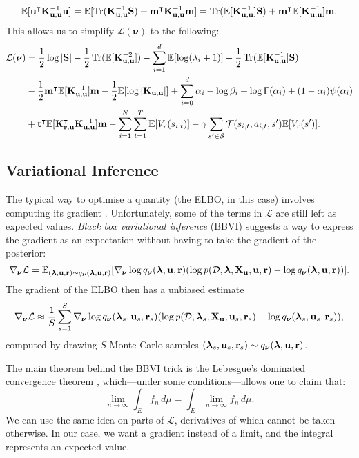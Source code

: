 \documentclass{mprop}
\theoremstyle{definition}
\DeclareMathOperator{\Tr}{Tr}
\begin{document}
\[ \mathbb{E}[\mathbf{u}^\intercal\Kuu^{-1}\mathbf{u}] =
  \mathbb{E}[\Tr(\Kuu^{-1}\mathbf{S}) +
  \mathbf{m}^\intercal\Kuu^{-1}\mathbf{m}] =
  \Tr(\mathbb{E}[\Kuu^{-1}]\mathbf{S}) +
  \mathbf{m}^\intercal\mathbb{E}[\Kuu^{-1}]\mathbf{m}. \]
This allows us to simplify $\mathcal{L}(\bm\nu)$ to the following:
\begin{align*}
  \mathcal{L}(\bm\nu) &= \frac{1}{2}\log|\mathbf{S}| - \frac{1}{2}\Tr(\mathbb{E}[\Kuu^{-2}]) - \sum_{i=1}^d \mathbb{E}[\log(\lambda_i + 1)] - \frac{1}{2}\Tr(\mathbb{E}[\Kuu^{-1}]\mathbf{S}) \\
  &- \frac{1}{2}\mathbf{m}^\intercal\mathbb{E}[\Kuu^{-1}]\mathbf{m} - \frac{1}{2}\mathbb{E}[\log|\Kuu|] + \sum_{i=0}^d \alpha_i - \log\beta_i + \log\Gamma(\alpha_i) + (1 - \alpha_i)\psi(\alpha_i) \\
  &+ \mathbf{t}^\intercal\mathbb{E}[\Kru^\intercal\Kuu^{-1}]\mathbf{m} - \sum_{i=1}^N \sum_{t=1}^T \mathbb{E}[V_r(s_{i,t})] - \gamma\sum_{s' \in \mathcal{S}} \mathcal{T}(s_{i,t}, a_{i,t}, s')\mathbb{E}[V_r(s')]. \\
\end{align*}

\subsection{Variational Inference} \label{vi_algs}

The typical way to optimise a quantity (the ELBO, in this case) involves
computing its gradient \cite{blei2017variational}. Unfortunately, some of the
terms in $\mathcal{L}$ are still left as expected values. \emph{Black box
  variational inference} (BBVI) \cite{DBLP:conf/aistats/RanganathGB14} suggests
a way to express the gradient as an expectation without having to take the
gradient of the posterior:
\[ \nabla_{\bm\nu} \mathcal{L} = \mathbb{E}_{(\bm\lambda, \mathbf{u}, \mathbf{r}) \sim q_{\bm\nu}(\bm\lambda, \mathbf{u}, \mathbf{r})}[\nabla_{\bm\nu} \log q_{\bm\nu}(\bm\lambda, \mathbf{u}, \mathbf{r})
  (\log p(\mathcal{D}, \bm\lambda, \mathbf{X_u}, \mathbf{u}, \mathbf{r}) - \log q_{\bm\nu}(\bm\lambda, \mathbf{u}, \mathbf{r}))]. \]
The gradient of the ELBO then has a unbiased estimate
\[ \nabla_{\bm\nu} \mathcal{L} \approx \frac{1}{S} \sum_{s=1}^S
  \nabla_{\bm\nu} \log q_{\bm\nu}(\bm\lambda_s, \mathbf{u}_s, \mathbf{r}_s) (\log p(\mathcal{D}, \bm\lambda_s, \mathbf{X_u}, \mathbf{u}_s, \mathbf{r}_s) - \log
  q_{\bm\nu}(\bm\lambda_s, \mathbf{u}_s, \mathbf{r}_s)), \]
computed by drawing $S$ Monte Carlo samples $(\bm\lambda_s, \mathbf{u}_s,
\mathbf{r}_s) \sim q_{\bm\nu}(\bm\lambda, \mathbf{u}, \mathbf{r})$.

The main theorem behind the BBVI trick is the Lebesgue's dominated convergence
theorem \cite{royden1988real}, which---under some conditions---allows one to
claim that:
\[ \lim_{n \to \infty} \int_E f_n\,d\mu = \int_E \lim_{n \to \infty}
  f_n\,d\mu. \]
We can use the same idea on parts of $\mathcal{L}$, derivatives of which cannot
be taken otherwise. In our case, we want a gradient instead of a limit, and the
integral represents an expected value.
\end{document}
